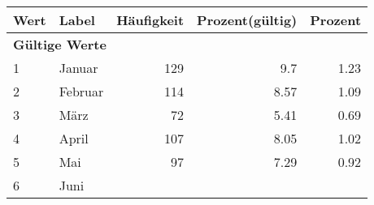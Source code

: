      \begin{longtable}{lXrrr}
     \toprule
     \textbf{Wert} & \textbf{Label} & \textbf{Häufigkeit} & \textbf{Prozent(gültig)} & \textbf{Prozent} \\
     \endhead
     \midrule
     \multicolumn{5}{l}{\textbf{Gültige Werte}}\\

     1 &
     \multicolumn{1}{X}{ Januar   } &


       \num{129} &
       \num[round-mode=places,round-precision=2]{9.7} &
         \num[round-mode=places,round-precision=2]{1.23} \\

     2 &
     \multicolumn{1}{X}{ Februar   } &


       \num{114} &
       \num[round-mode=places,round-precision=2]{8.57} &
         \num[round-mode=places,round-precision=2]{1.09} \\

     3 &
     \multicolumn{1}{X}{ März   } &


       \num{72} &
       \num[round-mode=places,round-precision=2]{5.41} &
         \num[round-mode=places,round-precision=2]{0.69} \\

     4 &
     \multicolumn{1}{X}{ April   } &


       \num{107} &
       \num[round-mode=places,round-precision=2]{8.05} &
         \num[round-mode=places,round-precision=2]{1.02} \\

     5 &
     \multicolumn{1}{X}{ Mai   } &


       \num{97} &
       \num[round-mode=places,round-precision=2]{7.29} &
         \num[round-mode=places,round-precision=2]{0.92} \\

     6 &
     \multicolumn{1}{X}{ Juni   } &



\end{longtable}
